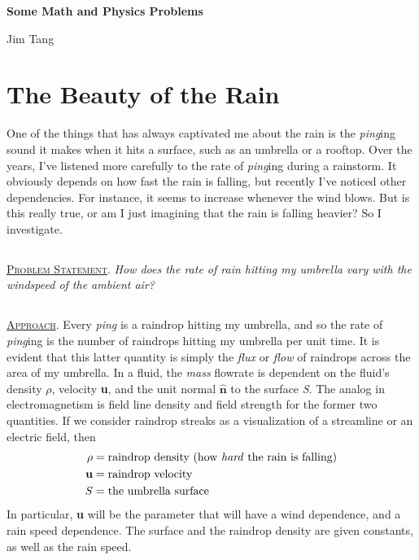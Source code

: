 \documentclass[11pt]{article}
\begin{document}
  \begin{center} {\LARGE\textbf{Some Math and Physics Problems}} \end{center}
  \begin{center} {\large Jim Tang} \end{center}

\section{The Beauty of the Rain}
One of the things that has always captivated me about the rain is the \textit{ping}ing sound it makes when it hits a surface, such as an umbrella or a rooftop. Over the years, I've listened more carefully to the rate of \textit{ping}ing during a rainstorm. It obviously depends on how fast the rain is falling, but recently I've noticed other dependencies. For instance, it seems to increase whenever the wind blows. But is this really true, or am I just imagining that the rain is falling heavier? So I investigate.

\subsection[Problem Statement]{} \textsc{\underline{Problem Statement}}. \textit{How does the rate of rain hitting my umbrella vary with the windspeed of the ambient air?}

\subsection[Approach]{} \textsc{\underline{Approach}}. Every \textit{ping} is a raindrop hitting my umbrella, and so the rate of \textit{ping}ing is the number of raindrops hitting my umbrella per unit time. It is evident that this latter quantity is simply the \textit{flux} or \textit{flow} of raindrops across the area of my umbrella. In a fluid, the \textit{mass} flowrate is dependent on the fluid's density $\rho$, velocity \textbf{u}, and the unit normal $\hat{\textbf{n}}$ to the surface \textit{S}. The analog in electromagnetism is field line density and field strength for the former two quantities. If we consider raindrop streaks as a visualization of a streamline or an electric field, then
\begin{align*}
\rho &= \text{raindrop density (how \textit{hard} the rain is falling)} \\
\textbf{u} &= \text{raindrop velocity} \\
S &= \text{the umbrella surface} 
\end{align*}
In particular, \textbf{u} will be the parameter that will have a wind dependence, and a rain speed dependence. The surface and the raindrop density are given constants, as well as the rain speed.
\end{document}
